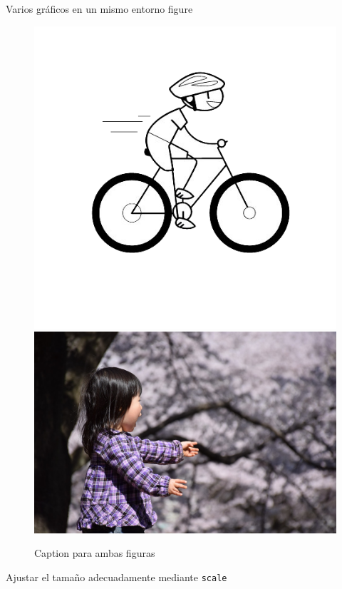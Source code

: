 \documentclass[10pt]{beamer}
\begin{document}
\begin{frame}[fragile]{ Varios gráficos en un mismo entorno figure}

\begin{figure}[h]
\centering
\includegraphics[scale=0.5]{./graficos/ciclista} 
\hspace{1cm}
\includegraphics[scale=0.1]{./graficos/sorpresa}
\caption{Caption para ambas figuras}
\label{fig:image2}
\end{figure}

Ajustar el tamaño adecuadamente mediante \texttt{scale}

\end{frame}
\end{document}
